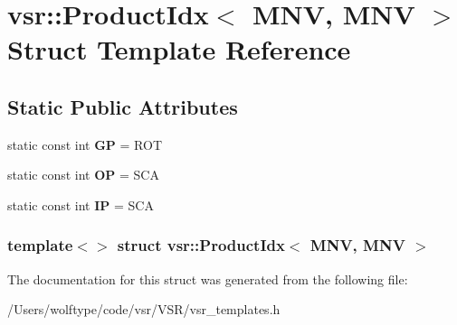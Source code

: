 \hypertarget{structvsr_1_1_product_idx_3_01_m_n_v_00_01_m_n_v_01_4}{\section{vsr\-:\-:Product\-Idx$<$ M\-N\-V, M\-N\-V $>$ Struct Template Reference}
\label{structvsr_1_1_product_idx_3_01_m_n_v_00_01_m_n_v_01_4}
}
\subsection*{Static Public Attributes}
\begin{DoxyCompactItemize}
\item 
\hypertarget{structvsr_1_1_product_idx_3_01_m_n_v_00_01_m_n_v_01_4_ae1edd32e157c8469cc55c45895cb6b3d}{static const int {\bfseries G\-P} = R\-O\-T}\label{structvsr_1_1_product_idx_3_01_m_n_v_00_01_m_n_v_01_4_ae1edd32e157c8469cc55c45895cb6b3d}

\item 
\hypertarget{structvsr_1_1_product_idx_3_01_m_n_v_00_01_m_n_v_01_4_a8765b7c152029a2ff75b14eb825ecad1}{static const int {\bfseries O\-P} = S\-C\-A}\label{structvsr_1_1_product_idx_3_01_m_n_v_00_01_m_n_v_01_4_a8765b7c152029a2ff75b14eb825ecad1}

\item 
\hypertarget{structvsr_1_1_product_idx_3_01_m_n_v_00_01_m_n_v_01_4_ae3b001accc4984aeb43800e9a52309c5}{static const int {\bfseries I\-P} = S\-C\-A}\label{structvsr_1_1_product_idx_3_01_m_n_v_00_01_m_n_v_01_4_ae3b001accc4984aeb43800e9a52309c5}

\end{DoxyCompactItemize}
\subsubsection*{template$<$$>$ struct vsr\-::\-Product\-Idx$<$ M\-N\-V, M\-N\-V $>$}



The documentation for this struct was generated from the following file\-:\begin{DoxyCompactItemize}
\item 
/\-Users/wolftype/code/vsr/\-V\-S\-R/vsr\-\_\-templates.\-h\end{DoxyCompactItemize}

